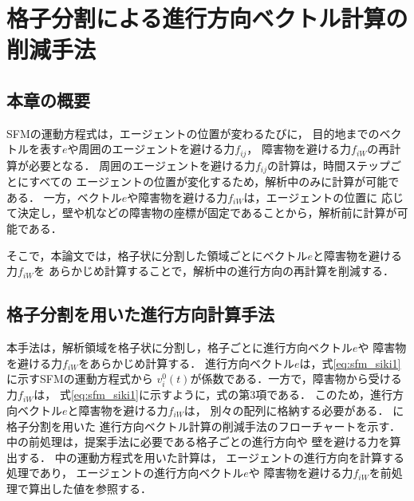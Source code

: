 \chapter{格子分割による進行方向ベクトル計算の削減手法}
\label{sec:method}
\section{本章の概要}
SFMの運動方程式は，エージェントの位置が変わるたびに，
目的地までのベクトルを表す$e$や周囲のエージェントを避ける力$f_{ij}$，
障害物を避ける力$f_{iW}$の再計算が必要となる．
周囲のエージェントを避ける力$f_{ij}$の計算は，時間ステップごとにすべての
エージェントの位置が変化するため，解析中のみに計算が可能である．
一方，ベクトル$e$や障害物を避ける力$f_{iW}$は，エージェントの位置に
応じて決定し，壁や机などの障害物の座標が固定であることから，解析前に計算が可能である．

そこで，本論文では，格子状に分割した領域ごとにベクトル$e$と障害物を避ける力$f_{iW}$を
あらかじめ計算することで，解析中の進行方向の再計算を削減する．

\section{格子分割を用いた進行方向計算手法}
本手法は，解析領域を格子状に分割し，格子ごとに進行方向ベクトル$e$や
障害物を避ける力$f_{iW}$をあらかじめ計算する．
進行方向ベクトル$e$は，式\eqref{eq:sfm_siki1}に示すSFMの運動方程式から
$v_i^0(t)$が係数である．一方で，障害物から受ける力$f_{iW}$は，
式\eqref{eq:sfm_siki1}に示すように，式の第3項である．
このため，進行方向ベクトル$e$と障害物を避ける力$f_{iW}$は，
別々の配列に格納する必要がある．
に格子分割を用いた
進行方向ベクトル計算の削減手法のフローチャートを示す．
中の前処理は，提案手法に必要である格子ごとの進行方向や
壁を避ける力を算出する．
中の運動方程式を用いた計算は，
エージェントの進行方向を計算する処理であり，
エージェントの進行方向ベクトル$e$や
障害物を避ける力$f_{iW}$を前処理で算出した値を参照する．


